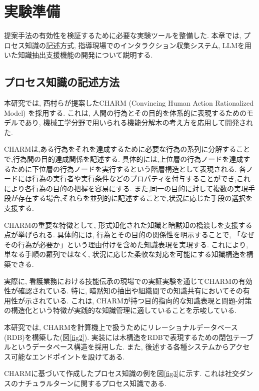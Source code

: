 \chapter{実験準備}
提案手法の有効性を検証するために必要な実験ツールを整備した. 本章では, プロセス知識の記述方式, 指導現場でのインタラクション収集システム, LLMを用いた知識抽出支援機能の開発について説明する.

\section{プロセス知識の記述方法}
本研究では, 西村らが提案したCHARM (Convincing Human Action Rationalized Model) \cite{Nishimura2008, Nishimura2015}を採用する. これは, 人間の行為とその目的を体系的に表現するためのモデルであり, 機械工学分野で用いられる機能分解木の考え方を応用して開発された.

CHARMは,ある行為をそれを達成するために必要な行為の系列に分解することで,行為間の目的達成関係を記述する. 具体的には,上位層の行為ノードを達成するために下位層の行為ノードを実行するという階層構造として表現される. 各ノードには行為の実行者や実行条件などのプロパティを付与することができ,これにより各行為の目的の把握を容易にする. また,同一の目的に対して複数の実現手段が存在する場合,それらを並列的に記述することで,状況に応じた手段の選択を支援する. 

CHARMの重要な特徴として, 形式知化された知識と暗黙知の橋渡しを支援する点が挙げられる. 具体的には, 行為とその目的の関係性を明示することで, 「なぜその行為が必要か」という理由付けを含めた知識表現を実現する. これにより, 単なる手順の羅列ではなく, 状況に応じた柔軟な対応を可能にする知識構造を構築できる.

実際に, 看護業務における技能伝承の現場での実証実験を通じてCHARMの有効性が確認されている. 特に, 暗黙知の抽出や組織間での知識共有においてその有用性が示されている. これは, CHARMが持つ目的指向的な知識表現と問題-対策の構造化という特徴が実践的な知識管理に適していることを示唆している.

本研究では, CHARMを計算機上で扱うためにリレーショナルデータベース(RDB)を構築した(図\ref{fig2}). 実装には木構造をRDBで表現するための閉包テーブルというデータベース構造を採用した. また, 後述する各種システムからアクセス可能なエンドポイントを設けてある.

CHARMに基づいて作成したプロセス知識の例を図\ref{fig3}に示す. これは社交ダンスのナチュラルターンに関するプロセス知識である.


